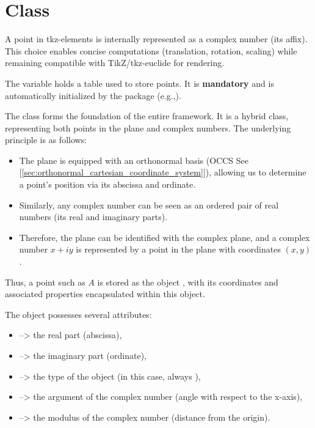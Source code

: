 \newpage

\section{Class }
A point in tkz-elements is internally represented as a complex number (its affix). This choice enables concise computations (translation, rotation, scaling) while remaining compatible with TikZ/tkz-euclide for rendering.


The variable  holds a table used to store points. It is \textbf{mandatory} and is automatically initialized by the package (e.g.,).


\vspace{1em}
The  class forms the foundation of the entire framework. It is a hybrid class, representing both points in the plane and complex numbers. The underlying principle is as follows:

\begin{itemize}
  \item The plane is equipped with an orthonormal basis (OCCS See [\ref{sec:orthonormal_cartesian_coordinate_system}]), allowing us to determine a point's position via its abscissa and ordinate.
  \item Similarly, any complex number can be seen as an ordered pair of real numbers (its real and imaginary parts).
  \item Therefore, the plane can be identified with the complex plane, and a complex number $x + iy$ is represented by a point in the plane with coordinates $(x, y)$.
\end{itemize}

Thus, a point such as $A$ is stored as the object , with its coordinates and associated properties encapsulated within this object.

\vspace{1em}
The  object possesses several attributes:
\begin{mybox}{}
\begin{itemize}
  \item {} --> the real part (abscissa),
  \item {} --> the imaginary part (ordinate),
  \item {} --> the type of the object (in this case, always ),
  \item {} --> the argument of the complex number (angle with respect to the x-axis),
  \item {} --> the modulus of the complex number (distance from the origin).
\end{itemize}
\end{mybox}



